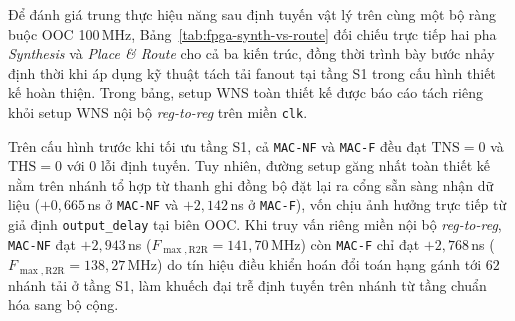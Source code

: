 Để đánh giá trung thực hiệu năng sau định tuyến vật lý trên cùng một bộ ràng
buộc OOC 100\,MHz, Bảng~\ref{tab:fpga-synth-vs-route} đối chiếu trực tiếp hai pha
\textit{Synthesis} và \textit{Place \& Route} cho cả ba kiến trúc, đồng thời
trình bày bước nhảy định thời khi áp dụng kỹ thuật tách tải fanout tại tầng S1
trong cấu hình thiết kế hoàn thiện. Trong bảng, setup WNS toàn thiết kế được báo
cáo tách riêng khỏi setup WNS nội bộ \textit{reg-to-reg} trên miền \texttt{clk}.



Trên cấu hình trước khi tối ưu tầng S1, cả \texttt{MAC-NF} và \texttt{MAC-F} đều
đạt $\mathrm{TNS}=0$ và $\mathrm{THS}=0$ với $0$ lỗi định tuyến. Tuy nhiên, đường
setup găng nhất toàn thiết kế nằm trên nhánh tổ hợp từ thanh ghi đồng bộ đặt lại
ra cổng sẵn sàng nhận dữ liệu ($+0{,}665$\,ns ở \texttt{MAC-NF} và $+2{,}142$\,ns
ở \texttt{MAC-F}), vốn chịu ảnh hưởng trực tiếp từ giả định \texttt{output\_delay}
tại biên OOC. Khi truy vấn riêng miền nội bộ \textit{reg-to-reg}, \texttt{MAC-NF}
đạt $+2{,}943$\,ns ($F_{\max,\mathrm{R2R}} = 141{,}70$\,MHz) còn \texttt{MAC-F}
chỉ đạt $+2{,}768$\,ns ($F_{\max,\mathrm{R2R}} = 138{,}27$\,MHz) do tín hiệu điều
khiển hoán đổi toán hạng gánh tới $62$ nhánh tải ở tầng S1, làm khuếch đại trễ
định tuyến trên nhánh từ tầng chuẩn hóa sang bộ cộng.

